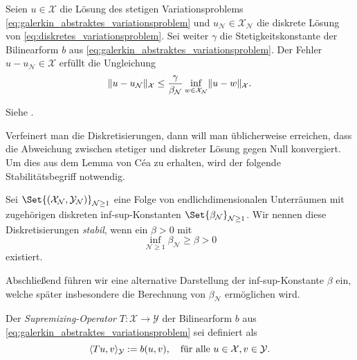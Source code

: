 \documentclass[../main.tex]{subfiles}
\begin{document}
\begin{Satz}\label{satz:lemma_von_cea}
    Seien $u \in \mathcal X$ die Lösung des stetigen Variationsproblems \cref{eq:galerkin_abstraktes_variationsproblem} und $u_{\mathcal N} \in \mathcal X_{\mathcal N}$ die diskrete Lösung von \cref{eq:diskretes_variationsproblem}.
    Sei weiter $\gamma$ die Stetigkeitskonstante der Bilinearform $b$ aus \cref{eq:galerkin_abstraktes_variationsproblem}.
    Der Fehler $u - u_{\mathcal N} \in \mathcal X$ erfüllt die Ungleichung
    \begin{equation}\label{eq:lemma_von_cea}
        \norm{u - u_{\mathcal N}}_{\mathcal X} \leq \frac{\gamma}{\beta_{\mathcal N}} \inf_{w \in \mathcal X_{\mathcal N}} \norm{u - w}_{\mathcal X}.
    \end{equation}

    \begin{Beweis}
        Siehe \cite[Theorem 3.2]{Nochetto:2009il}.
    \end{Beweis}
\end{Satz}

Verfeinert man die Diskretisierungen, dann will man üblicherweise erreichen, dass die Abweichung zwischen stetiger und diskreter Lösung gegen Null konvergiert.
Um dies aus dem Lemma von Céa zu erhalten, wird der folgende Stabilitätsbegriff notwendig.

\begin{Definition}\label{definition:stabile_diskretisierung}
    Sei $\Set{(\mathcal X_{\mathcal N}, \mathcal Y_{\mathcal N})}_{\mathcal N \geq 1}$ eine Folge von endlichdimensionalen Unterräumen mit zugehörigen diskreten inf-sup-Konstanten $\Set{\beta_{\mathcal N}}_{\mathcal N \geq 1}$.
    Wir nennen diese Diskretisierungen \emph{stabil}, wenn ein $\beta > 0$ mit
    \begin{equation}
        \inf_{\mathcal N \geq 1} \beta_{\mathcal N} \geq \beta > 0
    \end{equation}
    existiert.
\end{Definition}

Abschließend führen wir eine alternative Darstellung der inf-sup-Konstante $\beta$ ein, welche später insbesondere die Berechnung von $\beta_{\mathcal N}$ ermöglichen wird.

\begin{Definition}\label{definition:supremizing_operator}
    Der \emph{Supremizing-Operator} $T \colon \mathcal X \to \mathcal Y$ der Bilinearform $b$ aus \cref{eq:galerkin_abstraktes_variationsproblem} sei definiert als
    \begin{equation}
        \skp{Tu}{v}{\mathcal Y} := b(u, v), \quad \fa u \in \mathcal X, v \in \mathcal Y.
    \end{equation}
\end{Definition}
\end{document}
